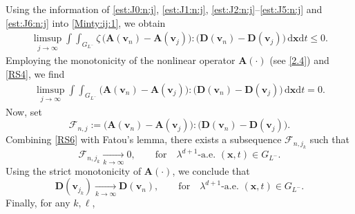 \documentclass[12pt,reqno]{amsart}
\numberwithin{equation}{section}
\theoremstyle{definition}
\def\dxt{\,\mathrm{d}\boldsymbol{x}\mathrm{d}t}
\def\div{\operatorname{div}}
\def\vv{\boldsymbol{v}}
\def\w{\boldsymbol{w}}
\def\x{\boldsymbol{x}}
\def\bfD{\mathbf{D}}
\def\bfA{\mathbf{A}}
\def\bmcA{\boldsymbol{\mathcal{A}}}
\begin{document}
{{{Using the information of \eqref{est:J0:n:j}, \eqref{est:J1:n:j}, \eqref{est:J2:n:j}--\eqref{est:J5:n:j} and \eqref{est:J6:n:j} into \eqref{Minty:ij:1}, we obtain
}}
\begin{align}\label{RS4}
	\limsup_{j\to\infty} \int\!\!\!\!\int_{G_{L^-}}\zeta\,\big(\bfA(\vv_n)-\bfA(\vv_j)\big):\big(\bfD(\vv_n)-\bfD(\vv_j)\big)\dxt\leq 0.
\end{align}
Employing the monotonicity of the nonlinear operator $\bfA(\cdot)$  (see \eqref{2.4}) and \eqref{RS4}, we find
\begin{align}\label{RS6}
		\limsup_{j\to\infty} \int\!\!\!\!\int_{G_{L^-}} \big(\bfA (\vv_n)-\bfA(\vv_j)\big):\big(\bfD(\vv_n)-\bfD(\vv_j) \big)\dxt = 0.
\end{align}
{Now, set
\begin{equation*}
\mathcal{F}_{n,j}:=\big(\bfA (\vv_n)-\bfA(\vv_j)\big):\big(\bfD(\vv_n)-\bfD(\vv_j) \big).
\end{equation*}
Combining \eqref{RS6} with Fatou's lemma, there exists a subsequence $\mathcal{F}_{n,j_k}$ such that
\begin{equation*}
\mathcal{F}_{n,j_k}\xrightarrow[k\to\infty]{}0,\qquad \text{for}\quad \lambda^{d+1}\text{-a.e. }(\x,t)\in G_{L^-}.
\end{equation*}
Using the strict monotonicity of $\bfA(\cdot)$, we conclude that
\begin{equation*}
\bfD(\vv_{j_k})\xrightarrow[k\to\infty]{} \bfD(\vv_n),\qquad \text{for}\quad \lambda^{d+1}\text{-a.e. }(\x,t)\in G_{L^-}.
\end{equation*}
Finally, for any $k,\ell$,
\begin{equation*}

\end{equation*}}}
\end{document}
